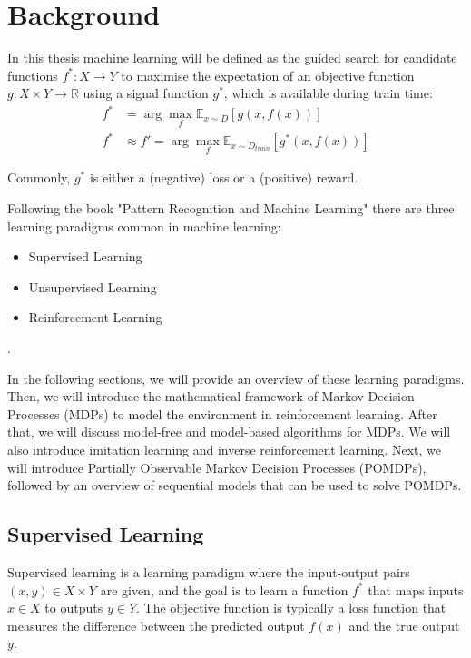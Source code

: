 
\chapter{Background}
\label{chapter:Background}
In this thesis machine learning will be defined as the guided search for candidate functions $f^*: X \to Y$ to maximise the expectation of an objective function 
${g: X \times Y \to \mathbb{R}}$ using a signal function $g^*$, which is available during train time:
\begin{equation}
    \label{general_learning_paradigm}
    \begin{aligned}
        f^* &= \arg\max_{f} \mathbb{E}_{x \sim D}[g(x,f(x))] \\
        f^* &\approx f' = \arg\max_{f} \mathbb{E}_{x \sim D_{train}}[g^*(x,f(x))]
    \end{aligned}
\end{equation}

Commonly, $g^*$ is either a (negative) loss or a (positive) reward.

Following the book "Pattern Recognition and Machine Learning" \cite{bishop} there are three learning paradigms common in machine learning: 
\begin{itemize}
	\item Supervised Learning
	\item Unsupervised Learning
	\item Reinforcement Learning
\end{itemize} .

In the following sections, we will provide an overview of these learning paradigms. 
Then, we will introduce the mathematical framework of Markov Decision Processes (MDPs) to model the environment in reinforcement learning. 
After that, we will discuss model-free and model-based algorithms for MDPs. We will also introduce imitation learning and inverse reinforcement learning. 
Next, we will introduce Partially Observable Markov Decision Processes (POMDPs), followed by an overview of sequential models that can be used 
to solve POMDPs.

\section{Supervised Learning}
\label{section:super_learn}
Supervised learning is a learning paradigm where the input-output pairs $(x,y) \in X \times Y$ are given, and the goal is to learn a function 
$f^*$ that maps inputs $x \in X$ to outputs $y \in Y$. The objective function is typically a loss function that measures the difference between 
the predicted output $f(x)$ and the true output $y$.

